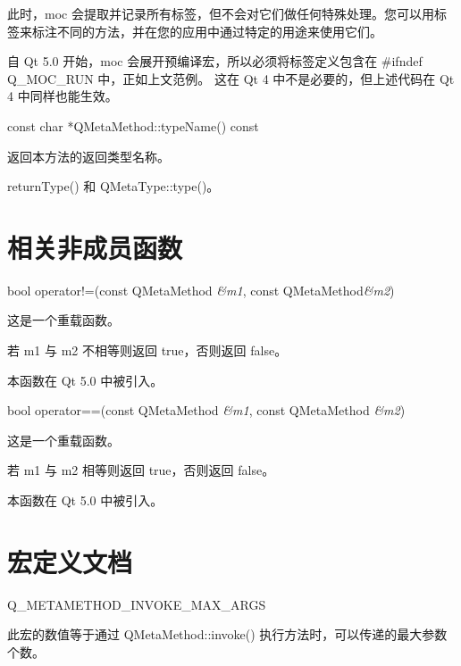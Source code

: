 
此时，moc 会提取并记录所有标签，但不会对它们做任何特殊处理。您可以用标签来标注不同的方法，并在您的应用中通过特定的用途来使用它们。

\begin{notice}
自 Qt 5.0 开始，moc 会展开预编译宏，所以必须将标签定义包含在 \#ifndef Q\_MOC\_RUN 中，正如上文范例。
这在 Qt 4 中不是必要的，但上述代码在 Qt 4 中同样也能生效。
\end{notice}

const char *QMetaMethod::typeName() const

返回本方法的返回类型名称。

\begin{notice}[另请参阅]
returnType() 和 QMetaType::type()。
\end{notice}

\section{相关非成员函数}

bool operator!=(const QMetaMethod \emph{\&m1}, const QMetaMethod\emph{\&m2})

这是一个重载函数。

若 m1 与 m2 不相等则返回 true，否则返回 false。

本函数在 Qt 5.0 中被引入。

bool operator==(const QMetaMethod \emph{\&m1}, const QMetaMethod \emph{\&m2})

这是一个重载函数。

若 m1 与 m2 相等则返回 true，否则返回 false。

本函数在 Qt 5.0 中被引入。

\section{宏定义文档}

Q\_METAMETHOD\_INVOKE\_MAX\_ARGS

此宏的数值等于通过 QMetaMethod::invoke() 执行方法时，可以传递的最大参数个数。